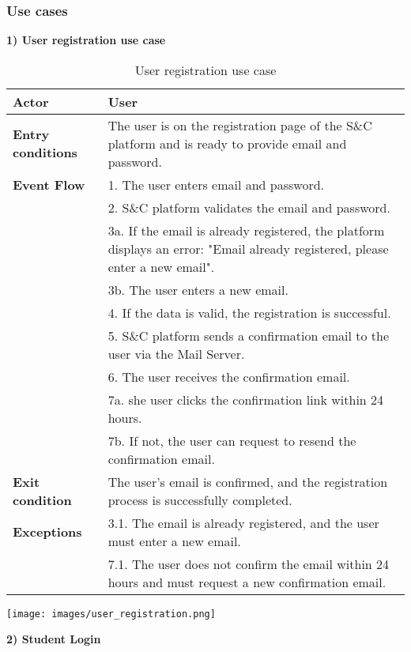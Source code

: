 \clearpage

\subsubsection{Use cases} 
\textbf{1) User registration use case}\\
\begin{table}[h!]
    \centering
    \begin{tabular}{lp{10cm}}
        \textbf{Actor} & User \\ \hline
        \textbf{Entry conditions} & The user is on the registration page of the S\&C platform and is ready to provide email and password. \\ \hline
        \textbf{Event Flow} & 
       1. The user enters email and password. \\
        & 2. S\&C platform validates the email and password. \\
        & 3a. If the email is already registered, the platform displays an error: "Email already registered, please enter a new email". \\
        & 3b. The user enters a new email. \\
        & 4. If the data is valid, the registration is successful. \\
        & 5. S\&C platform sends a confirmation email to the user via the Mail Server. \\
        & 6. The user receives the confirmation email. \\
        & 7a. she user clicks the confirmation link within 24 hours. \\
        & 7b. If not, the user can request to resend the confirmation email. \\
        \hline
        \textbf{Exit condition} & The user's email is confirmed, and the registration process is successfully completed. \\ \hline
        \textbf{Exceptions} & 
        3.1. The email is already registered, and the user must enter a new email. \\
        & 7.1. The user does not confirm the email within 24 hours and must request a new confirmation email. \\
    \end{tabular}
    \caption{User registration use case}
    \label{tab:user_registration}
\end{table}


\begin{center}
    \texttt{[image: images/user\_registration.png]}
\end{center}
\newpage
\textbf{2) Student Login}\\

